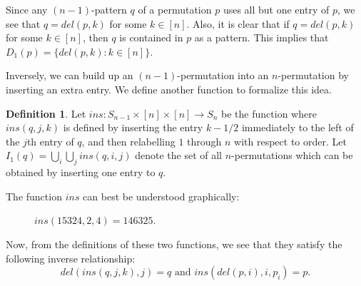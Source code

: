 \documentclass[11pt]{article}
\theoremstyle{plain}
\theoremstyle{definition}
\newtheorem{defn}[thm]{Definition}
\begin{document}
  Since any $(n-1)$-pattern $q$ of a permutation $p$ uses all but one entry of
  $p$, we see that $q = del(p,k)$ for some $k \in [n]$. Also, it is clear that if $q
  = del(p,k)$ for some $k \in [n]$, then $q$ is contained in $p$ as a pattern. This
  implies that $D_1(p) = \{del(p,k) : k\in [n] \}$.


  Inversely, we can build up an $(n-1)$-permutation into an $n$-permutation by
  inserting an extra entry.
  We define another function to formalize this idea.

  \begin{defn} 
  Let $ins : S_{n-1}\times [n] \times [n] \rightarrow S_n$ be the function where
  $ins(q,j,k)$ is defined by inserting the entry $k-1/2$ immediately to the left
  of the $j$th entry of $q$, and then relabelling $1$ through $n$ with respect
  to order. Let $I_1(q) = \bigcup_i \bigcup_j ins(q,i,j)$ denote the set of all
  $n$-permutations which can be obtained by inserting one entry to $q$. 
  \end{defn}

  The function $ins$ can best be understood graphically:

    \begin{figure}[ht]
      \centering
       \hspace{4pc}
   \caption{$ins(15324,2,4) = 146325$.}
   \end{figure}

  Now, from the definitions of these two functions, we see that they satisfy the
  following inverse relationship: 
  $$del(ins(q,j,k),j) = q \text{ and } ins(del(p,i),i,p_i) = p.$$
\end{document}
